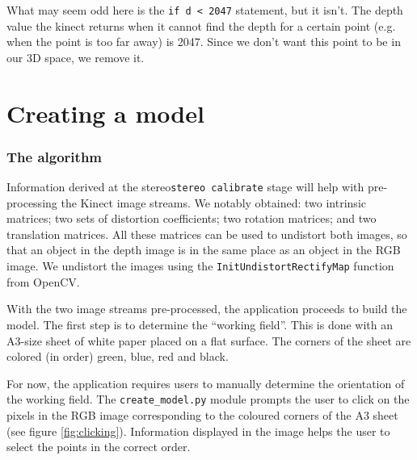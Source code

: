 What may seem odd here is the \verb|if d < 2047| statement, but it isn't. The depth value the kinect returns when it cannot find the depth for a certain point (e.g. when the point is too far away) is 2047. Since we don't want this point to be in our 3D space, we remove it.

\section{Creating a model}

\subsubsection{The algorithm}


Information derived at the stereo\texttt{stereo calibrate} stage will help with
pre-processing the Kinect image streams. We notably obtained: two intrinsic
matrices; two sets of distortion coefficients; two rotation matrices; and two
translation matrices. All these matrices can be used to undistort both images,
so that an object in the depth image is in the same place as an object in the
RGB image. We undistort the images using the \texttt{InitUndistortRectifyMap}
function from OpenCV.

With the two image streams pre-processed, the application proceeds to build the
model. The first step is to determine the ``working field''. This is done with
an A3-size sheet of white paper placed on a flat surface. The corners of the
sheet are colored (in order) green, blue, red and black.

For now, the application requires users to manually determine the orientation of
the working field. The \texttt{create\_model.py} module prompts the user to
click on the pixels in the RGB image corresponding to the coloured corners of
the A3 sheet (see figure \ref{fig:clicking}). Information displayed in the image helps the user to select the points in the correct order.

